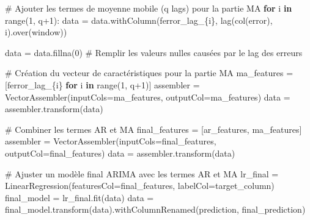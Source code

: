 \documentclass[
  letterpaper,
  DIV=11,
  numbers=noendperiod]{scrartcl}
\newenvironment{Shaded}{\begin{snugshade}}{\end{snugshade}}
\newcommand{\BuiltInTok}[1]{\textcolor[rgb]{0.00,0.23,0.31}{#1}}
\newcommand{\CommentTok}[1]{\textcolor[rgb]{0.37,0.37,0.37}{#1}}
\newcommand{\ControlFlowTok}[1]{\textcolor[rgb]{0.00,0.23,0.31}{\textbf{#1}}}
\newcommand{\DecValTok}[1]{\textcolor[rgb]{0.68,0.00,0.00}{#1}}
\newcommand{\KeywordTok}[1]{\textcolor[rgb]{0.00,0.23,0.31}{\textbf{#1}}}
\newcommand{\NormalTok}[1]{\textcolor[rgb]{0.00,0.23,0.31}{#1}}
\newcommand{\OperatorTok}[1]{\textcolor[rgb]{0.37,0.37,0.37}{#1}}
\newcommand{\SpecialCharTok}[1]{\textcolor[rgb]{0.37,0.37,0.37}{#1}}
\newcommand{\SpecialStringTok}[1]{\textcolor[rgb]{0.13,0.47,0.30}{#1}}
\newcommand{\StringTok}[1]{\textcolor[rgb]{0.13,0.47,0.30}{#1}}
\begin{document}
\begin{Shaded}
\begin{Highlighting}[]
    \CommentTok{\# Ajouter les termes de moyenne mobile (q lags) pour la partie MA}
    \ControlFlowTok{for}\NormalTok{ i }\KeywordTok{in} \BuiltInTok{range}\NormalTok{(}\DecValTok{1}\NormalTok{, q}\OperatorTok{+}\DecValTok{1}\NormalTok{):}
\NormalTok{        data }\OperatorTok{=}\NormalTok{ data.withColumn(}\SpecialStringTok{f\textquotesingle{}error\_lag\_}\SpecialCharTok{\{}\NormalTok{i}\SpecialCharTok{\}}\SpecialStringTok{\textquotesingle{}}\NormalTok{, lag(col(}\StringTok{\textquotesingle{}error\textquotesingle{}}\NormalTok{), i).over(window))}
    
\NormalTok{    data }\OperatorTok{=}\NormalTok{ data.fillna(}\DecValTok{0}\NormalTok{)  }\CommentTok{\# Remplir les valeurs nulles causées par le lag des erreurs}
    
    \CommentTok{\# Création du vecteur de caractéristiques pour la partie MA}
\NormalTok{    ma\_features }\OperatorTok{=}\NormalTok{ [}\SpecialStringTok{f\textquotesingle{}error\_lag\_}\SpecialCharTok{\{}\NormalTok{i}\SpecialCharTok{\}}\SpecialStringTok{\textquotesingle{}} \ControlFlowTok{for}\NormalTok{ i }\KeywordTok{in} \BuiltInTok{range}\NormalTok{(}\DecValTok{1}\NormalTok{, q}\OperatorTok{+}\DecValTok{1}\NormalTok{)]}
\NormalTok{    assembler }\OperatorTok{=}\NormalTok{ VectorAssembler(inputCols}\OperatorTok{=}\NormalTok{ma\_features, outputCol}\OperatorTok{=}\StringTok{\textquotesingle{}ma\_features\textquotesingle{}}\NormalTok{)}
\NormalTok{    data }\OperatorTok{=}\NormalTok{ assembler.transform(data)}
    
    \CommentTok{\# Combiner les termes AR et MA}
\NormalTok{    final\_features }\OperatorTok{=}\NormalTok{ [}\StringTok{\textquotesingle{}ar\_features\textquotesingle{}}\NormalTok{, }\StringTok{\textquotesingle{}ma\_features\textquotesingle{}}\NormalTok{]}
\NormalTok{    assembler }\OperatorTok{=}\NormalTok{ VectorAssembler(inputCols}\OperatorTok{=}\NormalTok{final\_features, outputCol}\OperatorTok{=}\StringTok{\textquotesingle{}final\_features\textquotesingle{}}\NormalTok{)}
\NormalTok{    data }\OperatorTok{=}\NormalTok{ assembler.transform(data)}
    
    \CommentTok{\# Ajuster un modèle final ARIMA avec les termes AR et MA}
\NormalTok{    lr\_final }\OperatorTok{=}\NormalTok{ LinearRegression(featuresCol}\OperatorTok{=}\StringTok{\textquotesingle{}final\_features\textquotesingle{}}\NormalTok{, labelCol}\OperatorTok{=}\NormalTok{target\_column)}
\NormalTok{    final\_model }\OperatorTok{=}\NormalTok{ lr\_final.fit(data)}
\NormalTok{    data }\OperatorTok{=}\NormalTok{ final\_model.transform(data).withColumnRenamed(}\StringTok{\textquotesingle{}prediction\textquotesingle{}}\NormalTok{, }\StringTok{\textquotesingle{}final\_prediction\textquotesingle{}}\NormalTok{)}
    

\end{Highlighting}
\end{Shaded}
\end{document}
